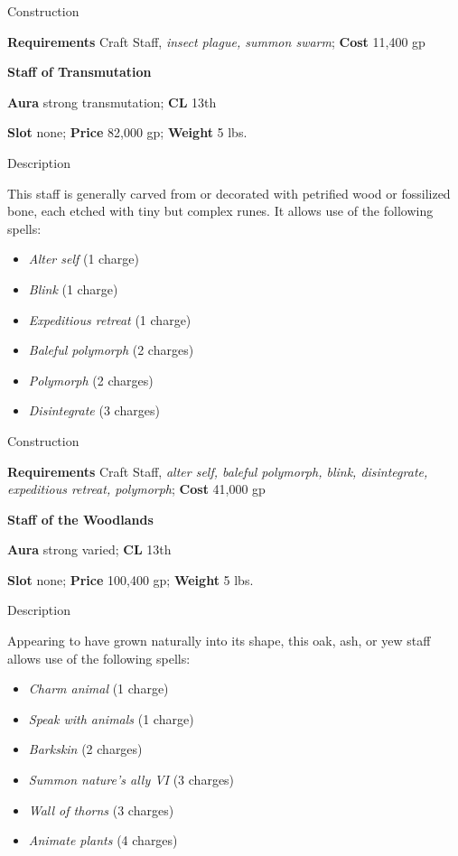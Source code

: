 Construction
				
\textbf{Requirements} Craft Staff, \textit{insect plague, summon swarm}; \textbf{Cost }11,400 gp
				
\textbf{Staff of Transmutation}
				
\textbf{Aura} strong transmutation; \textbf{CL} 13th
				
\textbf{Slot} none; \textbf{Price} 82,000 gp; \textbf{Weight} 5 lbs.
				
Description
				
This staff is generally carved from or decorated with petrified wood or fossilized bone, each etched with tiny but complex runes. It allows use of the following spells:
				\begin{itemize}\item  \textit{Alter self} (1 charge)
				\item  \textit{Blink} (1 charge)
				\item  \textit{Expeditious retreat} (1 charge)
				\item  \textit{Baleful polymorph} (2 charges)
				\item  \textit{Polymorph} (2 charges)
				\item  \textit{Disintegrate} (3 charges) 
\end{itemize}
				
Construction
				
\textbf{Requirements} Craft Staff, \textit{alter self, baleful polymorph, blink, disintegrate, expeditious retreat, polymorph}; \textbf{Cost }41,000 gp
				
\textbf{Staff of the Woodlands}
				
\textbf{Aura} strong varied; \textbf{CL} 13th
				
\textbf{Slot} none; \textbf{Price} 100,400 gp; \textbf{Weight} 5 lbs.
				
Description
				
Appearing to have grown naturally into its shape, this oak, ash, or yew staff allows use of the following spells:
				\begin{itemize}\item  \textit{Charm animal} (1 charge)
				\item  \textit{Speak with animals} (1 charge)
				\item  \textit{Barkskin} (2 charges)
				\item  \textit{Summon nature's ally VI} (3 charges)
				\item  \textit{Wall of thorns} (3 charges)
				\item  \textit{Animate plants} (4 charges)
\end{itemize}
				
